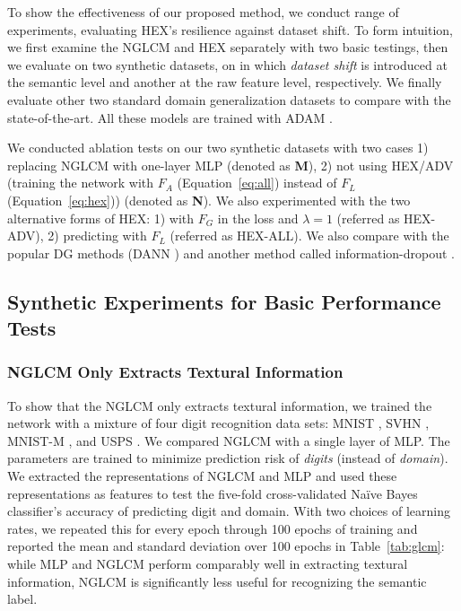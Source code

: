 To show the effectiveness of our proposed method, 
we conduct range of experiments, 
evaluating HEX's resilience against dataset shift.
To form intuition, we first examine the NGLCM and HEX 
separately with two basic testings, 
then we evaluate on two synthetic datasets, 
on in which \textit{dataset shift} is introduced at the semantic level 
and another at the raw feature level, respectively. 
We finally evaluate other two standard domain generalization datasets 
to compare with the state-of-the-art. 
All these models are trained with ADAM \citep{kingma2014adam}. 

We conducted ablation tests on our two synthetic datasets 
with two cases 1) replacing NGLCM with one-layer MLP (denoted as \textbf{M}), 
2) not using HEX/ADV (training the network with $F_A$ (Equation~\ref{eq:all})
instead of $F_L$ (Equation~\ref{eq:hex})) (denoted as \textbf{N}). 
We also experimented with the two alternative forms of HEX: 
1) with $F_G$ in the loss and $\lambda=1$ (referred as HEX-ADV), 
2) predicting with $F_L$ (referred as HEX-ALL).
We also compare with the popular DG methods (DANN \citep{ganin2016domain}) 
and another method called information-dropout \citep{achille2018information}. 

\subsection{Synthetic Experiments for Basic Performance Tests}
\label{sec:synthetic}

\subsubsection{NGLCM Only Extracts Textural Information}
To show that the NGLCM only extracts textural information, 
we trained the network with a mixture of four digit recognition data sets: MNIST \citep{lecun1998gradient}, SVHN \citep{netzer2011reading}, 
MNIST-M \citep{ganin2014unsupervised}, 
and USPS \citep{denker1989neural}. 
We compared NGLCM with a single layer of MLP. 
The parameters are trained to minimize prediction risk of \textit{digits} (instead of \textit{domain}).
We extracted the representations of NGLCM and MLP 
and used these representations as features to test 
the five-fold cross-validated Na\"ive Bayes classifier's accuracy 
of predicting digit and domain. 
With two choices of learning rates, 
we repeated this for every epoch through 100 epochs of training 
and reported the mean and standard deviation 
over 100 epochs in Table~\ref{tab:glcm}: 
while MLP and NGLCM perform comparably well 
in extracting textural information, 
NGLCM is significantly less useful for recognizing the semantic label. 

